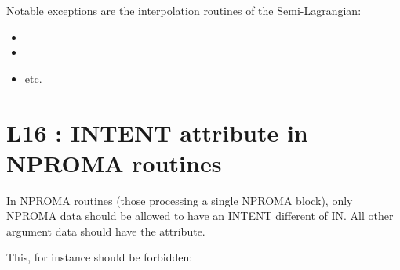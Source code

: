 \documentclass[letterpaper,10pt,english]{sphinxmanual}
\begin{document}
Notable exceptions are the interpolation routines of the Semi-Lagrangian:
\begin{itemize}
\item {} 

\item {} 

\item {} 
etc.

\end{itemize}


\section{L16 : INTENT attribute in NPROMA routines}
\label{\detokenize{rules/L16:l16-intent-attribute-in-nproma-routines}}\label{\detokenize{rules/L16::doc}}
In NPROMA routines (those processing a single NPROMA block), only NPROMA data should
be allowed to have an INTENT different of IN.
All other argument data should have the  attribute.

This, for instance should be forbidden:

\begin{sphinxVerbatim}[commandchars=\\\{\}]
  
 
 
 

  
  
\end{sphinxVerbatim}
\end{document}
